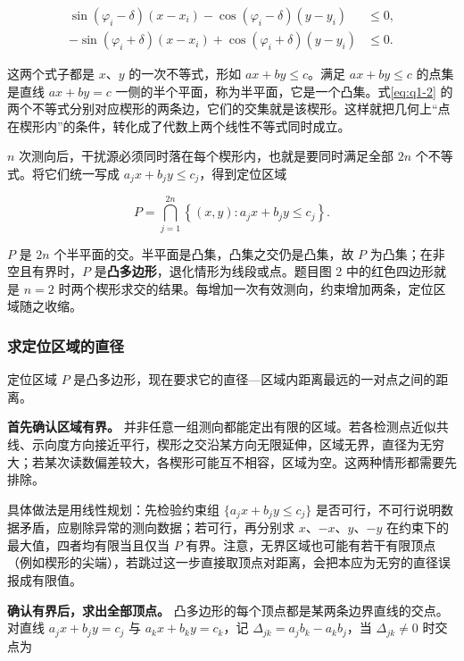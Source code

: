 \documentclass[UTF8,a4paper,zihao=5,fontset=fandol]{ctexart}
\begin{document}
\begin{equation}\label{eq:q1-2}
\begin{aligned}
\sin(\varphi_i-\delta)(x-x_i)-\cos(\varphi_i-\delta)(y-y_i)&\le 0,\\
-\sin(\varphi_i+\delta)(x-x_i)+\cos(\varphi_i+\delta)(y-y_i)&\le 0.
\end{aligned}
\end{equation}

这两个式子都是 $x$、$y$ 的一次不等式，形如 $ax+by\le c$。满足 $ax+by\le c$ 的点集是直线 $ax+by=c$ 一侧的半个平面，称为半平面，它是一个凸集。式\eqref{eq:q1-2} 的两个不等式分别对应楔形的两条边，它们的交集就是该楔形。这样就把几何上“点在楔形内”的条件，转化成了代数上两个线性不等式同时成立。

$n$ 次测向后，干扰源必须同时落在每个楔形内，也就是要同时满足全部 $2n$ 个不等式。将它们统一写成 $a_jx+b_jy\le c_j$，得到定位区域

\begin{equation}\label{eq:q1-3}
P=\bigcap_{j=1}^{2n}\left\{(x,y):a_jx+b_jy\le c_j\right\}.
\end{equation}

$P$ 是 $2n$ 个半平面的交。半平面是凸集，凸集之交仍是凸集，故 $P$ 为凸集；在非空且有界时，$P$ 是\textbf{凸多边形}，退化情形为线段或点。题目图 2 中的红色四边形就是 $n=2$ 时两个楔形求交的结果。每增加一次有效测向，约束增加两条，定位区域随之收缩。

\subsubsection{求定位区域的直径}\label{sec:q1-2}

定位区域 $P$ 是凸多边形，现在要求它的直径---区域内距离最远的一对点之间的距离。

\textbf{首先确认区域有界。} 并非任意一组测向都能定出有限的区域。若各检测点近似共线、示向度方向接近平行，楔形之交沿某方向无限延伸，区域无界，直径为无穷大；若某次读数偏差较大，各楔形可能互不相容，区域为空。这两种情形都需要先排除。

具体做法是用线性规划：先检验约束组 $\{a_jx+b_jy\le c_j\}$ 是否可行，不可行说明数据矛盾，应剔除异常的测向数据；若可行，再分别求 $x$、$-x$、$y$、$-y$ 在约束下的最大值，四者均有限当且仅当 $P$ 有界。注意，无界区域也可能有若干有限顶点（例如楔形的尖端），若跳过这一步直接取顶点对距离，会把本应为无穷的直径误报成有限值。

\textbf{确认有界后，求出全部顶点。} 凸多边形的每个顶点都是某两条边界直线的交点。对直线 $a_jx+b_jy=c_j$ 与 $a_kx+b_ky=c_k$，记 $\Delta_{jk}=a_jb_k-a_kb_j$，当 $\Delta_{jk}\ne0$ 时交点为
\end{document}
